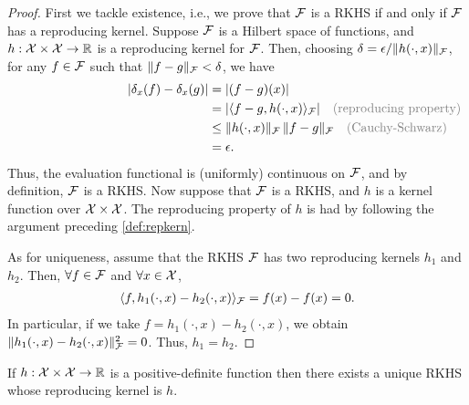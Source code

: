 \begin{proof}
  First we tackle existence, i.e., we prove that ${\mathcal F}$ is a RKHS if and only if ${\mathcal F}$ has a reproducing kernel.
  Suppose ${\mathcal F}$ is a Hilbert space of functions, and $h:{\mathcal X}\times{\mathcal X}\to\mathbb{R}$ is a reproducing kernel for ${\mathcal F}$.
  Then, choosing $\delta=\epsilon / \lVert h(\cdot,x)\rVert_{\mathcal F}$, for any $f \in {\mathcal F}$ such that $\lVert f-g\rVert_{\mathcal F} < \delta$, we have
  \begin{align*}
    \vert \delta_x (f) - \delta_x (g) \vert 
    &= \vert (f-g)(x) \vert \\
    &= |\ip{f-g,h(\cdot,x)}_\cF| \mycomment{(reproducing property)} \\
    &\leq \norm{h(\cdot,x)}_\cF \, \norm{f-g}_\cF \mycomment{(Cauchy-Schwarz)} \\
    &= \epsilon.
  \end{align*}
  Thus, the evaluation functional is (uniformly) continuous on ${\mathcal F}$, and by definition, ${\mathcal F}$ is a RKHS.
  Now suppose that ${\mathcal F}$ is a RKHS, and $h$ is a kernel function over ${\mathcal X}\times{\mathcal X}$.
  The reproducing property of $h$ is had by following the argument preceding \cref{def:repkern}.
 
  As for uniqueness, assume that the RKHS ${\mathcal F}$ has two reproducing kernels $h_1$ and $h_2$. 
  Then, $\forall f\in{\mathcal F}$ and $\forall x\in{\mathcal X}$,
  \begin{align*}
    \langle f,h_1(\cdot,x) - h_2(\cdot,x)\rangle_{\mathcal F} = f(x) - f(x) = 0.
  \end{align*}
  In particular, if we take $f = h_1(\cdot,x) - h_2(\cdot,x)$, we obtain $\lVert h_1(\cdot,x) - h_2(\cdot,x)\rVert^2_{\mathcal F} = 0$.
  Thus, $h_1=h_2$.
\end{proof}

\begin{theorem}\label{thm:moorea}
  If $h:{\mathcal X}\times{\mathcal X}\to\mathbb{R}$ is a positive-definite function then there exists a unique RKHS whose reproducing kernel is $h$.
\end{theorem}

